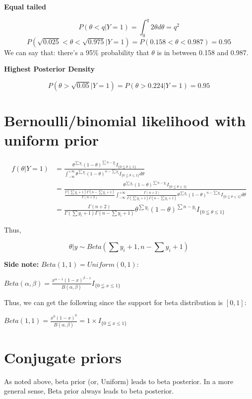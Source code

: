 \documentclass[]{book}
\begin{document}
\textbf{Equal tailed}

\[P(\theta < q|Y=1)=\int_0^q 2\theta d\theta=q^2\]
\[P(\sqrt{0.025}<\theta<\sqrt{0.975}|Y=1)=P(0.158<\theta<0.987)=0.95\]
We can say that: there's a 95\% probability that \(\theta\) is in
between 0.158 and 0.987.

\textbf{Highest Posterior Density}

\[P(\theta > \sqrt{0.05}|Y=1)=P(\theta >0.224|Y=1)=0.95\]

\section{Bernoulli/binomial likelihood with uniform
prior}\label{bernoullibinomial-likelihood-with-uniform-prior}

\[\begin{aligned}  f(\theta | Y=1) &= \frac{\theta^{\sum y_i}(1-\theta)^{\sum n-y_i} I_{\{0 \leqq \theta \leqslant 1\}}}{\int_{-\infty}^{+\infty} \theta^{\sum y_i}(1-\theta)^{n-\sum y_i} I_{\{0 \leqq \theta \leqslant 1\}} d\theta} \\ &=\frac{\theta^{\sum y_i}(1-\theta)^{\sum n-y_i} I_{\{0 \leqq \theta \leqslant 1\}}}{\frac{\Gamma(\sum y_i+1)\Gamma(n-\sum y_i+1)}{\Gamma(n+2)} \int_{-\infty}^{+\infty} \frac{\Gamma(n+2)}{\Gamma(\sum y_i+1)\Gamma(n-\sum y_i+1)} \theta^{\sum y_i}(1-\theta)^{n-\sum y_i} I_{\{0 \leqq \theta \leqslant 1\}} d\theta} \\ &= \frac{\Gamma(n+2)}{\Gamma(\sum y_i+1)\Gamma(n-\sum y_i+1)}\theta^{\sum y_i}(1-\theta)^{\sum n-y_i} I_{\{0 \leqq \theta \leqslant 1\}}  \end{aligned} \]

Thus,

\[\theta | y \sim Beta (\sum y_i+1, n-\sum y_i +1)\]

\textbf{Side note:} \(Beta(1,1)=Uniform(0,1)\):

\(Beta(\alpha,\beta)=\frac{x^{\alpha-1}(1-x)^{\beta-1}}{B(\alpha,\beta)} I_{\{0 \leqq x \leqslant 1\}}\)

Thus, we can get the following since the support for beta distribution
is \([0,1]\):

\(Beta(1,1)=\frac{x^0(1-x)^0}{B(\alpha,\beta)}=1\times I_{\{0 \leqq x \leqslant 1\}}\)

\section{Conjugate priors}\label{conjugate-priors}

As noted above, beta prior (or, Uniform) leads to beta posterior. In a
more general sense, Beta prior always leads to beta posterior.
\end{document}
